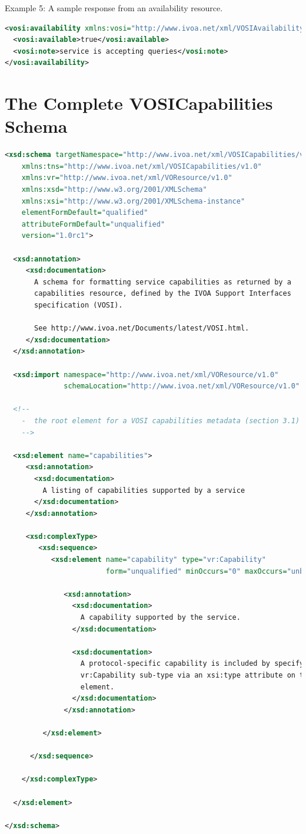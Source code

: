 \documentclass[11pt,letter]{ivoa}
\begin{document}
Example 5:
A sample response from an availability resource.

\begin{lstlisting}[language=XML]
<vosi:availability xmlns:vosi="http://www.ivoa.net/xml/VOSIAvailability/v1.0">
  <vosi:available>true</vosi:available>
  <vosi:note>service is accepting queries</vosi:note>
</vosi:availability>
\end{lstlisting}

\appendix

\section{The Complete VOSICapabilities Schema}
\begin{lstlisting}[language=XML]
<xsd:schema targetNamespace="http://www.ivoa.net/xml/VOSICapabilities/v1.0"
    xmlns:tns="http://www.ivoa.net/xml/VOSICapabilities/v1.0"
    xmlns:vr="http://www.ivoa.net/xml/VOResource/v1.0"
    xmlns:xsd="http://www.w3.org/2001/XMLSchema"
    xmlns:xsi="http://www.w3.org/2001/XMLSchema-instance"
    elementFormDefault="qualified"
    attributeFormDefault="unqualified"
    version="1.0rc1">

  <xsd:annotation>
     <xsd:documentation>
       A schema for formatting service capabilities as returned by a 
       capabilities resource, defined by the IVOA Support Interfaces 
       specification (VOSI). 

       See http://www.ivoa.net/Documents/latest/VOSI.html.  
     </xsd:documentation>
  </xsd:annotation>

  <xsd:import namespace="http://www.ivoa.net/xml/VOResource/v1.0"
              schemaLocation="http://www.ivoa.net/xml/VOResource/v1.0" />

  <!--
    -  the root element for a VOSI capabilities metadata (section 3.1)
    -->

  <xsd:element name="capabilities">
     <xsd:annotation>
       <xsd:documentation>
         A listing of capabilities supported by a service
       </xsd:documentation>
     </xsd:annotation>

     <xsd:complexType>
        <xsd:sequence>
           <xsd:element name="capability" type="vr:Capability" 
                        form="unqualified" minOccurs="0" maxOccurs="unbounded">

              <xsd:annotation>
                <xsd:documentation>
                  A capability supported by the service.  
                </xsd:documentation>

                <xsd:documentation>
                  A protocol-specific capability is included by specifying a
                  vr:Capability sub-type via an xsi:type attribute on this 
                  element.
                </xsd:documentation>
              </xsd:annotation>

         </xsd:element>

      </xsd:sequence>

    </xsd:complexType>

  </xsd:element>

</xsd:schema>
\end{lstlisting}
\end{document}
